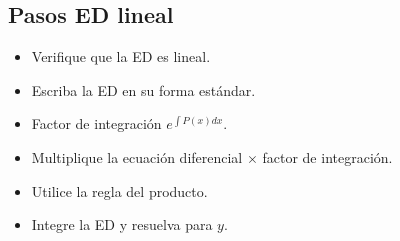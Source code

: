 \subsection{Pasos ED lineal}
\begin{itemize}
    \item Verifique que la ED es lineal.
    \item Escriba la ED en su forma estándar.
    \item Factor de integración $\displaystyle e^{\int P(x)dx}$.
    \item Multiplique la ecuación diferencial $\times$ factor de integración.
    \item Utilice la regla del producto.
    \item Integre la ED y resuelva para $y$.
\end{itemize}


